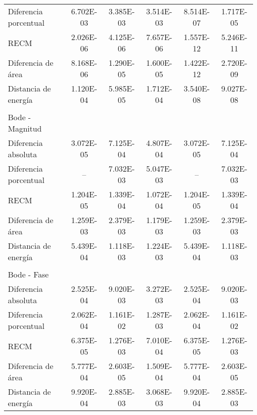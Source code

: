 {\begin{longtable}{l @{\extracolsep{\fill}} ccccc}
            Diferencia porcentual  & \num{6.702E-03} & \num{3.385E-03} & \num{3.514E-03} & \num{8.514E-07} & \num{1.717E-05}  \\
            RECM                   & \num{2.026E-06} & \num{4.125E-06} & \num{7.657E-06} & \num{1.557E-12} & \num{5.246E-11}  \\
            Diferencia de área     & \num{8.168E-06} & \num{1.290E-05} & \num{1.600E-05} & \num{1.422E-12} & \num{2.720E-09}  \\
            Distancia de energía   & \num{1.120E-04} & \num{5.985E-05} & \num{1.712E-04} & \num{3.540E-08} & \num{9.027E-08}  \\
            & & & & & \\
            Bode - Magnitud        &  &  &  &  & \\ \cmidrule{1-1}
            Diferencia absoluta    & \num{3.072E-05} & \num{7.125E-04} & \num{4.807E-04} & \num{3.072E-05} & \num{7.125E-04}  \\
            Diferencia porcentual  &        --       & \num{7.032E-03} & \num{5.047E-03} &        --       & \num{7.032E-03}  \\
            RECM                   & \num{1.204E-05} & \num{1.339E-04} & \num{1.072E-04} & \num{1.204E-05} & \num{1.339E-04}  \\
            Diferencia de área     & \num{1.259E-03} & \num{2.379E-03} & \num{1.179E-03} & \num{1.259E-03} & \num{2.379E-03}  \\
            Distancia de energía   & \num{5.439E-04} & \num{1.118E-03} & \num{1.224E-03} & \num{5.439E-04} & \num{1.118E-03}  \\
            & & & & & \\
            Bode - Fase            &  &  &  &  & \\ \cmidrule{1-1}
            Diferencia absoluta    & \num{2.525E-04} & \num{9.020E-03} & \num{3.272E-03} & \num{2.525E-04} & \num{9.020E-03}  \\
            Diferencia porcentual  & \num{2.062E-04} & \num{1.161E-02} & \num{1.287E-03} & \num{2.062E-04} & \num{1.161E-02}  \\
            RECM                   & \num{6.375E-05} & \num{1.276E-03} & \num{7.010E-04} & \num{6.375E-05} & \num{1.276E-03}  \\
            Diferencia de área     & \num{5.777E-04} & \num{2.603E-05} & \num{1.509E-04} & \num{5.777E-04} & \num{2.603E-05}  \\
            Distancia de energía   & \num{9.920E-04} & \num{2.885E-03} & \num{3.068E-03} & \num{9.920E-04} & \num{2.885E-03}  \\

\end{longtable}}
